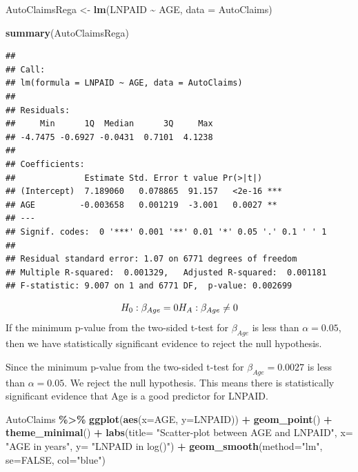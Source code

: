 \documentclass[
]{article}
\newenvironment{Shaded}{\begin{snugshade}}{\end{snugshade}}
\newcommand{\AttributeTok}[1]{\textcolor[rgb]{0.13,0.29,0.53}{#1}}
\newcommand{\ConstantTok}[1]{\textcolor[rgb]{0.56,0.35,0.01}{#1}}
\newcommand{\FunctionTok}[1]{\textcolor[rgb]{0.13,0.29,0.53}{\textbf{#1}}}
\newcommand{\NormalTok}[1]{#1}
\newcommand{\OtherTok}[1]{\textcolor[rgb]{0.56,0.35,0.01}{#1}}
\newcommand{\SpecialCharTok}[1]{\textcolor[rgb]{0.81,0.36,0.00}{\textbf{#1}}}
\newcommand{\StringTok}[1]{\textcolor[rgb]{0.31,0.60,0.02}{#1}}
\begin{document}
\begin{Shaded}
\begin{Highlighting}[]
\NormalTok{AutoClaimsRega }\OtherTok{\textless{}{-}} \FunctionTok{lm}\NormalTok{(LNPAID }\SpecialCharTok{\textasciitilde{}}\NormalTok{ AGE, }\AttributeTok{data =}\NormalTok{ AutoClaims)}

\FunctionTok{summary}\NormalTok{(AutoClaimsRega)}
\end{Highlighting}
\end{Shaded}

\begin{verbatim}
## 
## Call:
## lm(formula = LNPAID ~ AGE, data = AutoClaims)
## 
## Residuals:
##     Min      1Q  Median      3Q     Max 
## -4.7475 -0.6927 -0.0431  0.7101  4.1238 
## 
## Coefficients:
##              Estimate Std. Error t value Pr(>|t|)    
## (Intercept)  7.189060   0.078865  91.157   <2e-16 ***
## AGE         -0.003658   0.001219  -3.001   0.0027 ** 
## ---
## Signif. codes:  0 '***' 0.001 '**' 0.01 '*' 0.05 '.' 0.1 ' ' 1
## 
## Residual standard error: 1.07 on 6771 degrees of freedom
## Multiple R-squared:  0.001329,   Adjusted R-squared:  0.001181 
## F-statistic: 9.007 on 1 and 6771 DF,  p-value: 0.002699
\end{verbatim}

\[
H_0: \beta_{Age} = 0 \\
H_A: \beta_{Age} \not= 0
\] If the minimum p-value from the two-sided t-test for \(\beta_{Age}\)
is less than \(\alpha=0.05\), then we have statistically significant
evidence to reject the null hypothesis.

Since the minimum p-value from the two-sided t-test for
\(\beta_{Age}=0.0027\) is less than \(\alpha=0.05\). We reject the null
hypothesis. This means there is statistically significant evidence that
Age is a good predictor for LNPAID.

\begin{Shaded}
\begin{Highlighting}[]
\NormalTok{AutoClaims }\SpecialCharTok{\%\textgreater{}\%}
  \FunctionTok{ggplot}\NormalTok{(}\FunctionTok{aes}\NormalTok{(}\AttributeTok{x=}\NormalTok{AGE, }\AttributeTok{y=}\NormalTok{LNPAID)) }\SpecialCharTok{+}
  \FunctionTok{geom\_point}\NormalTok{() }\SpecialCharTok{+}
  \FunctionTok{theme\_minimal}\NormalTok{() }\SpecialCharTok{+}
  \FunctionTok{labs}\NormalTok{(}\AttributeTok{title=} \StringTok{"Scatter{-}plot between AGE and LNPAID"}\NormalTok{,}
       \AttributeTok{x=} \StringTok{"AGE in years"}\NormalTok{,}
       \AttributeTok{y=} \StringTok{"LNPAID in log($$)"}\NormalTok{) }\SpecialCharTok{+}
  \FunctionTok{geom\_smooth}\NormalTok{(}\AttributeTok{method=}\StringTok{"lm"}\NormalTok{, }\AttributeTok{se=}\ConstantTok{FALSE}\NormalTok{, }\AttributeTok{col=}\StringTok{"blue"}\NormalTok{)}
\end{Highlighting}
\end{Shaded}
\end{document}
